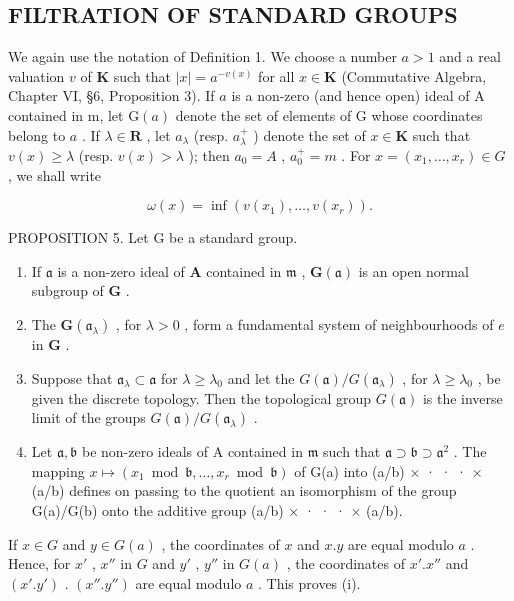 \subsection{FILTRATION OF STANDARD GROUPS}

We again use the notation of Definition 1. We choose a number \(a > 1\) and a real valuation \(v\) of \(\mathbf{K}\) such that \(|x| = a^{-v(x)}\) for all \(x \in \mathbf{K}\) (Commutative Algebra, Chapter VI, §6, Proposition 3). If \(a\) is a non-zero (and hence open) ideal of A contained in m, let \(\mathrm{G}(a)\) denote the set of elements of G whose coordinates belong to \(a\) . If \(\lambda \in \mathbf{R}\) , let \(a_{\lambda}\) (resp. \(a_{\lambda}^{+}\) ) denote the set of \(x \in \mathbf{K}\) such that \(v(x) \geqslant \lambda\) (resp. \(v(x) > \lambda\) ); then \(a_0 = A\) , \(a_0^+ = m\) . For \(x = (x_1, \ldots, x_r) \in G\) , we shall write

\[
\omega (x) = \inf (v (x _ {1}), \dots , v (x _ {r})).\tag{5}
\]

PROPOSITION 5. Let G be a standard group.

\begin{enumerate}
\def\labelenumi{(\roman{enumi})}
\item
  If \(\mathfrak{a}\) is a non-zero ideal of \(\mathbf{A}\) contained in \(\mathfrak{m}\) , \(\mathbf{G}(\mathfrak{a})\) is an open normal subgroup of \(\mathbf{G}\) .
\item
  The \(\mathbf{G}(\mathfrak{a}_{\lambda})\) , for \(\lambda > 0\) , form a fundamental system of neighbourhoods of \(e\) in \(\mathbf{G}\) .
\item
  Suppose that \(\mathfrak{a}_{\lambda} \subset \mathfrak{a}\) for \(\lambda \geqslant \lambda_0\) and let the \(G(\mathfrak{a}) / G(\mathfrak{a}_{\lambda})\) , for \(\lambda \geqslant \lambda_0\) , be given the discrete topology. Then the topological group \(G(\mathfrak{a})\) is the inverse limit of the groups \(G(\mathfrak{a}) / G(\mathfrak{a}_{\lambda})\) .
\item
  Let \(\mathfrak{a},\mathfrak{b}\) be non-zero ideals of A contained in \(\mathfrak{m}\) such that \(\mathfrak{a} \supset \mathfrak{b} \supset \mathfrak{a}^2\) . The mapping \(x \mapsto (x_1 \bmod \mathfrak{b}, \ldots, x_r \bmod \mathfrak{b})\) of G(a) into (a/b) × · · · × (a/b) defines on passing to the quotient an isomorphism of the group G(a)/G(b) onto the additive group (a/b) × · · · × (a/b).
\end{enumerate}

If \(x \in G\) and \(y \in G(a)\) , the coordinates of \(x\) and \(x.y\) are equal modulo \(a\) . Hence, for \(x'\) , \(x''\) in \(G\) and \(y'\) , \(y''\) in \(G(a)\) , the coordinates of \(x'.x''\) and \((x'.y')\) . \((x''.y'')\) are equal modulo \(a\) . This proves (i).

